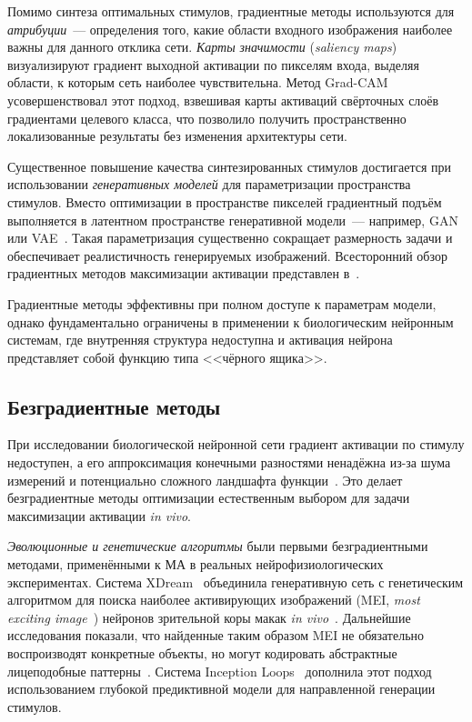 Помимо синтеза оптимальных стимулов, градиентные методы используются для \textit{атрибуции}~--- определения того, какие области входного изображения наиболее важны для данного отклика сети. \textit{Карты значимости} (\textit{saliency maps})~\cite{Simonyan2014} визуализируют градиент выходной активации по пикселям входа, выделяя области, к которым сеть наиболее чувствительна. Метод Grad-CAM~\cite{Selvaraju2017} усовершенствовал этот подход, взвешивая карты активаций свёрточных слоёв градиентами целевого класса, что позволило получить пространственно локализованные результаты без изменения архитектуры сети.

Существенное повышение качества синтезированных стимулов достигается при использовании \textit{генеративных моделей} для параметризации пространства стимулов. Вместо оптимизации в пространстве пикселей градиентный подъём выполняется в латентном пространстве генеративной модели~--- например, GAN~\cite{GANpaper} или VAE~\cite{VAE-vanilla-Kingma-Welling}. Такая параметризация существенно сокращает размерность задачи и обеспечивает реалистичность генерируемых изображений. Всесторонний обзор градиентных методов максимизации активации представлен в~\cite{Nguyen2019}.

Градиентные методы эффективны при полном доступе к параметрам модели, однако фундаментально ограничены в применении к биологическим нейронным системам, где внутренняя структура недоступна и активация нейрона представляет собой функцию типа <<чёрного ящика>>.

\subsection{Безградиентные методы}\label{sec:gradfree_am}

При исследовании биологической нейронной сети градиент активации по стимулу недоступен, а его аппроксимация конечными разностями ненадёжна из-за шума измерений и потенциально сложного ландшафта функции~\cite{Pospelov2025}. Это делает безградиентные методы оптимизации естественным выбором для задачи максимизации активации \textit{in vivo}.

\textit{Эволюционные и генетические алгоритмы} были первыми безградиентными методами, применёнными к МА в реальных нейрофизиологических экспериментах. Система XDream~\cite{XDream} объединила генеративную сеть с генетическим алгоритмом для поиска наиболее активирующих изображений (MEI, \textit{most exciting image}~\cite{Inception-what-excites-neurons-most}) нейронов зрительной коры макак \textit{in vivo}~\cite{ponce2019evolving}. Дальнейшие исследования показали, что найденные таким образом MEI не обязательно воспроизводят конкретные объекты, но могут кодировать абстрактные лицеподобные паттерны~\cite{bardon2022face}. Система Inception Loops~\cite{Inception-what-excites-neurons-most} дополнила этот подход использованием глубокой предиктивной модели для направленной генерации стимулов.

